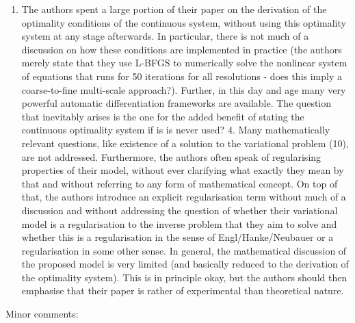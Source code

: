 \documentclass[11pt,a4paper]{article}
\begin{document}
\begin{enumerate}
\item[] The authors spent a large portion of their paper on the derivation of the optimality conditions of the continuous system, without using this optimality system at any stage afterwards. In particular, there is not much of a discussion on how these conditions are implemented in practice (the authors merely state that they use L-BFGS to numerically solve the nonlinear system of equations that runs for 50 iterations for all resolutions - does this imply a coarse-to-fine multi-scale approach?). Further, in this day and age many very powerful automatic differentiation frameworks are available. The question that inevitably arises is the one for the added benefit of stating the continuous optimality system if is is never used? 4. Many mathematically relevant questions, like existence of a solution to the variational problem (10), are not addressed. Furthermore, the authors often speak of regularising properties of their model, without ever clarifying what exactly they mean by that and without referring to any form of mathematical concept. On top of that, the authors introduce an explicit regularisation term without much of a discussion and without addressing the question of whether their variational model is a regularisation to the inverse problem that they aim to solve and whether this is a regularisation in the sense of Engl/Hanke/Neubauer or a regularisation in some other sense. In general, the mathematical discussion of the proposed model is very limited (and basically reduced to the derivation of the optimality system). This is in principle okay, but the authors should then emphasise that their paper is rather of experimental than theoretical nature.
\end{enumerate}
Minor comments:
\end{document}
